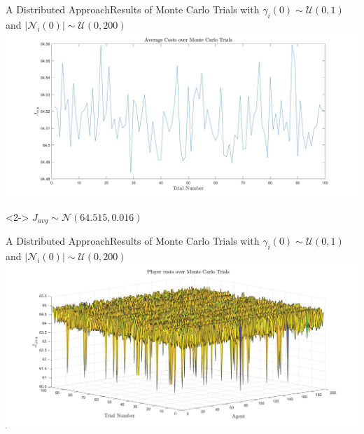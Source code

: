 \documentclass[aspectratio=169]{beamer}
\begin{document}
\begin{frame}{A Distributed Approach}{Results of Monte Carlo Trials with $\gamma_i(0) \sim \mathcal{U}(0,1)$ and $|\mathcal{N}_i(0)| \sim \mathcal{U}(0,200)$}
    \includegraphics[width=\linewidth]{images/results_distributed_avg_cost.jpg}
    \begin{block}<2->{}
        $J_{avg} \sim \mathcal{N}(64.515, 0.016)$
    \end{block}
\end{frame}

\begin{frame}{A Distributed Approach}{Results of Monte Carlo Trials with $\gamma_i(0) \sim \mathcal{U}(0,1)$ and $|\mathcal{N}_i(0)| \sim \mathcal{U}(0,200)$}
    \includegraphics[width=\linewidth]{images/results_distributed_avg_player_cost.jpg}
\end{frame}
\end{document}
